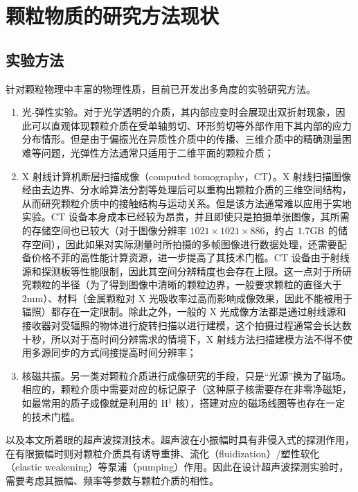 \section{颗粒物质的研究方法现状}


\subsection{实验方法}

针对颗粒物理中丰富的物理性质，目前已开发出多角度的实验研究方法。

\begin{enumerate}
  \item 光-弹性实验\cite{photoelasticimetry}。对于光学透明的介质，其内部应变时会展现出双折射现象，因此可以直观体现颗粒介质在受单轴剪切、环形剪切等外部作用下其内部的应力分布情形。但是由于偏振光在异质性介质中的传播、三维介质中的精确测量困难等问题\cite{Non-Destructive_3D_Photoelasticity}，光弹性方法通常只适用于二维平面的颗粒介质；
  \item X 射线计算机断层扫描成像（computed tomography，CT）\cite{PhysRevE.68.020301}。X 射线扫描图像经由去边界、分水岭算法分割等处理后可以重构出颗粒介质的三维空间结构，从而研究颗粒介质中的接触结构与运动关系。但是该方法通常难以应用于实地实验。CT 设备本身成本已经较为昂贵，并且即使只是拍摄单张图像，其所需的存储空间也已较大（对于图像分辨率 $1021\times 1021 \times 886$，约占 $1.7\unit{\giga\byte}$ 的储存空间\cite{xujiazhao}），因此如果对实际测量时所拍摄的多帧图像进行数据处理，还需要配备价格不菲的高性能计算资源，进一步提高了其技术门槛。CT 设备由于射线源和探测板等性能限制，因此其空间分辨精度也会存在上限。这一点对于所研究颗粒的半径（为了得到图像中清晰的颗粒边界，一般要求颗粒的直径大于 $2\unit{\milli\meter}$）、材料（金属颗粒对 X 光吸收率过高而影响成像效果，因此不能被用于辐照）都存在一定限制。除此之外，一般的 X 光成像方法都是通过射线源和接收器对受辐照的物体进行旋转扫描以进行建模，这个拍摄过程通常会长达数十秒，所以对于高时间分辨需求的情境下，X 射线方法扫描建模方法不得不使用多源同步\cite{wang2008ultrafast}的方式间接提高时间分辨率；
  \item 核磁共振\cite{CLARKE2023}。另一类对颗粒介质进行成像研究的手段，只是“光源”换为了磁场。相应的，颗粒介质中需要对应的标记原子（这种原子核需要存在非零净磁矩，如最常用的质子成像就是利用的 H$^{1}$ 核），搭建对应的磁场线圈等也存在一定的技术门槛。
\end{enumerate}

以及本文所着眼的超声波探测技术。超声波在小振幅时具有非侵入式的探测作用，在有限振幅时则对颗粒介质具有诱导重排\cite{PhysRevE.84.020301}、流化（fluidization）/塑性软化（elastic weakening）\cite{PhysRevE.84.020301}等泵浦（pumping）作用。因此在设计超声波探测实验时，需要考虑其振幅、频率等参数与颗粒介质的相性。

